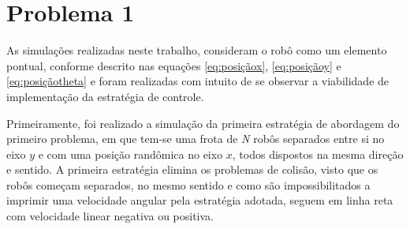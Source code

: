 \chapter{Problema 1}
\label{chap:Simulacoes}

As simulações realizadas neste trabalho, consideram o robô como um elemento pontual, conforme descrito nas equações \ref{eq:posiçãox}, \ref{eq:posiçãoy} e \ref{eq:posiçãotheta} e foram realizadas com intuito de se observar a viabilidade de implementação da estratégia de controle. 

Primeiramente, foi realizado a simulação da primeira estratégia de abordagem do primeiro problema, em que tem-se uma frota de \emph{N} robôs separados entre si no eixo $y$ e com uma posição randômica no eixo $x$, todos dispostos na mesma direção e sentido. A primeira estratégia elimina os problemas de colisão, visto que os robôs começam separados, no mesmo sentido e como são impossibilitados a imprimir uma velocidade angular pela estratégia adotada, seguem em linha reta com velocidade linear negativa ou positiva.  
